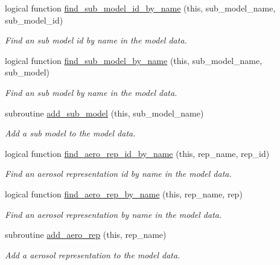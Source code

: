 \begin{DoxyCompactItemize}
logical function \mbox{\hyperlink{namespacepmc__phlex__core_a8d2b79aaaf8f3daaca1b8afebb3aa770}{find\+\_\+sub\+\_\+model\+\_\+id\+\_\+by\+\_\+name}} (this, sub\+\_\+model\+\_\+name, sub\+\_\+model\+\_\+id)
\begin{DoxyCompactList}\small\item\em Find an sub model id by name in the model data. \end{DoxyCompactList}\item 
logical function \mbox{\hyperlink{namespacepmc__phlex__core_a25cc42c8f12d39982a873e5781b401c9}{find\+\_\+sub\+\_\+model\+\_\+by\+\_\+name}} (this, sub\+\_\+model\+\_\+name, sub\+\_\+model)
\begin{DoxyCompactList}\small\item\em Find an sub model by name in the model data. \end{DoxyCompactList}\item 
subroutine \mbox{\hyperlink{namespacepmc__phlex__core_ae4c08262f0fb5062148b052b7152e2eb}{add\+\_\+sub\+\_\+model}} (this, sub\+\_\+model\+\_\+name)
\begin{DoxyCompactList}\small\item\em Add a sub model to the model data. \end{DoxyCompactList}\item 
logical function \mbox{\hyperlink{namespacepmc__phlex__core_a84a6e46e13db3a40ccb17208af50b9e0}{find\+\_\+aero\+\_\+rep\+\_\+id\+\_\+by\+\_\+name}} (this, rep\+\_\+name, rep\+\_\+id)
\begin{DoxyCompactList}\small\item\em Find an aerosol representation id by name in the model data. \end{DoxyCompactList}\item 
logical function \mbox{\hyperlink{namespacepmc__phlex__core_a4d4254f0dbd33ac2e656cedc2f7fd3d3}{find\+\_\+aero\+\_\+rep\+\_\+by\+\_\+name}} (this, rep\+\_\+name, rep)
\begin{DoxyCompactList}\small\item\em Find an aerosol representation by name in the model data. \end{DoxyCompactList}\item 
subroutine \mbox{\hyperlink{namespacepmc__phlex__core_a7f01e1349e2d9387d646b46a676dcb78}{add\+\_\+aero\+\_\+rep}} (this, rep\+\_\+name)
\begin{DoxyCompactList}\small\item\em Add a aerosol representation to the model data. \end{DoxyCompactList}\item 

\end{DoxyCompactItemize}
